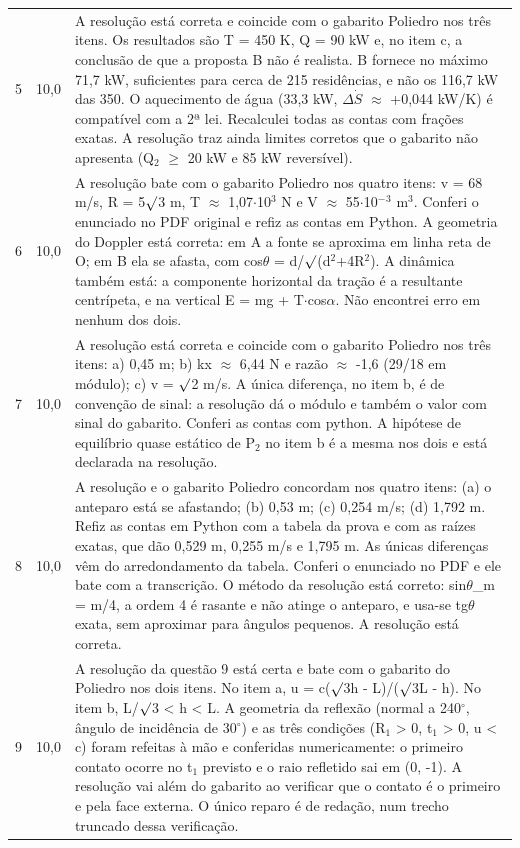 \documentclass{article}%
\begin{document}
\begin{longtable}{@{}c c p{}@{}}
5 & 10,0 & A resolução está correta e coincide com o gabarito Poliedro nos três itens. Os resultados são T = 450 K, Q = 90 kW e, no item c, a conclusão de que a proposta B não é realista. B fornece no máximo 71,7 kW, suficientes para cerca de 215 residências, e não os 116,7 kW das 350. O aquecimento de água (33,3 kW, $\Delta$$\dot S$ $\approx$ +0,044 kW/K) é compatível com a 2ª lei. Recalculei todas as contas com frações exatas. A resolução traz ainda limites corretos que o gabarito não apresenta (Q$_{2}$ $\geq$ 20 kW e 85 kW reversível). \\
6 & 10,0 & A resolução bate com o gabarito Poliedro nos quatro itens: v = 68 m/s, R = 5$\surd$3 m, T $\approx$ 1,07$\cdot$10$^3$ N e V $\approx$ 55$\cdot$10$^{-}$$^3$ m$^3$. Conferi o enunciado no PDF original e refiz as contas em Python. A geometria do Doppler está correta: em A a fonte se aproxima em linha reta de O; em B ela se afasta, com cos$\theta$ = d/$\surd$(d$^2$+4R$^2$). A dinâmica também está: a componente horizontal da tração é a resultante centrípeta, e na vertical E = mg + T$\cdot$cos$\alpha$. Não encontrei erro em nenhum dos dois. \\
7 & 10,0 & A resolução está correta e coincide com o gabarito Poliedro nos três itens: a) 0,45 m; b) kx $\approx$ 6,44 N e razão $\approx$ -1,6 (29/18 em módulo); c) v = $\surd$2 m/s. A única diferença, no item b, é de convenção de sinal: a resolução dá o módulo e também o valor com sinal do gabarito. Conferi as contas com python. A hipótese de equilíbrio quase estático de P$_{2}$ no item b é a mesma nos dois e está declarada na resolução. \\
8 & 10,0 & A resolução e o gabarito Poliedro concordam nos quatro itens: (a) o anteparo está se afastando; (b) 0,53 m; (c) 0,254 m/s; (d) 1,792 m. Refiz as contas em Python com a tabela da prova e com as raízes exatas, que dão 0,529 m, 0,255 m/s e 1,795 m. As únicas diferenças vêm do arredondamento da tabela. Conferi o enunciado no PDF e ele bate com a transcrição. O método da resolução está correto: sin$\theta$\_m = m/4, a ordem 4 é rasante e não atinge o anteparo, e usa{-}se tg$\theta$ exata, sem aproximar para ângulos pequenos. A resolução está correta. \\
9 & 10,0 & A resolução da questão 9 está certa e bate com o gabarito do Poliedro nos dois itens. No item a, u = c($\surd$3h - L)/($\surd$3L - h). No item b, L/$\surd$3 < h < L. A geometria da reflexão (normal a 240$^\circ$, ângulo de incidência de 30$^\circ$) e as três condições (R$_{1}$ > 0, t$_{1}$ > 0, u < c) foram refeitas à mão e conferidas numericamente: o primeiro contato ocorre no t$_{1}$ previsto e o raio refletido sai em (0, -1). A resolução vai além do gabarito ao verificar que o contato é o primeiro e pela face externa. O único reparo é de redação, num trecho truncado dessa verificação. \\

\end{longtable}
\end{document}
